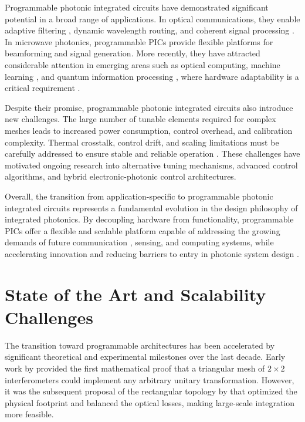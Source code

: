 Programmable photonic integrated circuits have demonstrated significant potential in a broad range 
of applications. In optical communications, they enable adaptive filtering 
\cite{catala-lahozSelfconfiguringProgrammableSilicon2023}, dynamic wavelength 
routing, and coherent signal processing \cite{perezReconfigurableLatticeMesh2016,
marpaungIntegratedMicrowavePhotonics2019}.
In microwave photonics, programmable PICs provide flexible platforms for beamforming and signal 
generation. More recently, they have attracted considerable attention in emerging areas such as 
optical computing, machine learning \cite{tsakyridisPhotonicNeuralNetworks2024}, and quantum 
information processing \cite{aharonovichProgrammableIntegratedQuantum2026}, where hardware 
adaptability is a critical requirement \cite{shenDeepLearningCoherent2017}.


Despite their promise, programmable photonic integrated circuits also introduce new challenges. 
The large number of tunable elements required for complex meshes leads to increased power 
consumption, control overhead, and calibration complexity. Thermal crosstalk, control drift, and 
scaling limitations must be carefully addressed to ensure stable and reliable operation 
\cite{cemThermalCrosstalkModeling2023, teofilovicThermalCrosstalkModelling2024, 
millerSelfconfiguringUniversalLinear2013, sacchiIntegratedElectronicController2025}. These 
challenges have motivated ongoing research into alternative tuning mechanisms, advanced control 
algorithms, and hybrid electronic-photonic control architectures.

Overall, the transition from application-specific to programmable photonic integrated circuits 
represents a fundamental evolution in the design philosophy of integrated photonics. By decoupling 
hardware from functionality, programmable PICs offer a flexible and scalable platform capable of 
addressing the growing demands of future communication 
\cite{xieSoftwaredefinedOpticalNetworking2024}, sensing, and computing systems, while accelerating 
innovation and reducing barriers to entry in photonic system design
\cite{bogaertsProgrammablePhotonicCircuits2020}.


\section{State of the Art and Scalability Challenges} \label{sec:sota_challenges}

The transition toward programmable architectures has been accelerated by significant theoretical 
and experimental milestones over the last decade. Early work by 
\cite{reckExperimentalRealizationAny1994} provided the first mathematical proof that a triangular 
mesh of $2\times2$ interferometers could implement any arbitrary unitary transformation. However, 
it was the subsequent proposal of the rectangular topology by 
\cite{clementsOptimalDesignUniversal2016} that optimized the physical footprint and balanced the 
optical losses, making large-scale integration more feasible.

